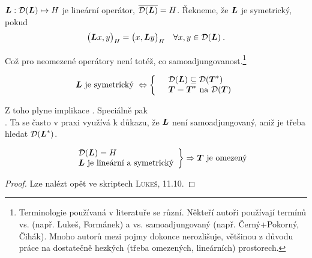 \begin{definition}
$\boldsymbol{L} : \mathcal{D}(\boldsymbol{L}) \mapsto H$ je lineární operátor, $\overline{\mathcal{D}(\boldsymbol{L})} = H $. Řekneme, že $\boldsymbol{L}$ je symetrický, pokud \begin{align*}
    \big( \boldsymbol{L} x, y \big)_H = \big( x, \boldsymbol{L} y \big)_H \quad \forall x,y \in \mathcal{D}(\boldsymbol{L}) \:.
\end{align*}
\end{definition}
Což pro neomezené operátory není totéž, co samoadjungovanost.\footnote{
Terminologie používaná v literatuře se různí. Někteří autoři používají termínů  vs.  (např. Lukeš, Formánek) a  vs. samoadjungovaný (např. Černý+Pokorný, Čihák). Mnoho autorů mezi pojmy dokonce nerozlišuje, většinou z důvodu práce na dostatečně hezkých (třeba omezených, lineárních) prostorech.}
\begin{lemma}
    \begin{equation*}
    \begin{split}
        \boldsymbol{L} \text{ je symetrický }\Leftrightarrow\left \{
    \begin{array}{ll}
        &\mathcal{D}(\boldsymbol{L}) \subseteq \mathcal{D}(\boldsymbol{T}^*)\\
        &\boldsymbol{T}=\boldsymbol{T}^* \text{ na }\mathcal{D}(\boldsymbol{T})
    \end{array}
        \right.
    \end{split}
\end{equation*}
\end{lemma}
Z toho plyne implikace . Speciálně pak \\ . Ta se často v praxi využívá k důkazu, že $\boldsymbol{L}$ není samoadjungovaný, aniž je třeba hledat $\mathcal{D}(\boldsymbol{L}^*)$.

\begin{theorem}
    \begin{equation*}
    \begin{split}
        \left.
    \begin{array}{ll}
        &\mathcal{D}(\boldsymbol{L})=H\\
        &\boldsymbol{L} \text{ je lineární a symetrický}
    \end{array}
        \right \} \Rightarrow \boldsymbol{T} \text{ je omezený}
    \end{split}
\end{equation*}
\end{theorem}
\begin{proof}
Lze nalézt opět ve skriptech \textsc{Lukeš}, 11.10.
\end{proof}

